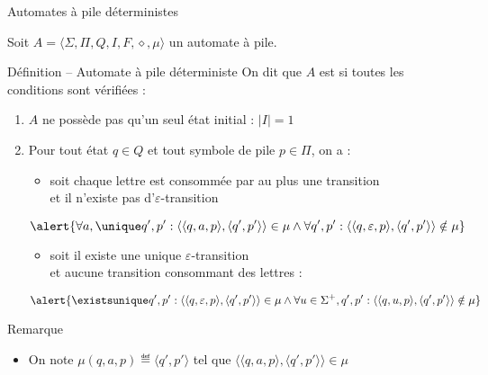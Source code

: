 
\begingroup

\begin{frame}{Automates à pile déterministes}

  Soit $A = \langle \Sigma, \Pi, Q, I, F, \diamond, \mu \rangle$ un automate à pile.

  \vspace{-1mm}
  \begin{block}{Définition -- Automate à pile déterministe}
    On dit que $A$ est  si toutes les conditions sont vérifiées : 
    \begin{enumerate}
    \item $A$ ne possède pas qu'un seul état initial : \alert{$|I| = 1$}
    \item Pour tout état $q \in Q$ et tout symbole de pile $p \in \Pi$, on a : 
      \begin{itemize}
      \item soit chaque lettre est consommée par au plus une transition \\
        et il n'existe pas d'$\varepsilon$-transition \\
      \end{itemize}
      $$\alert{\forall a, \unique q', p' : \langle \langle q, a, p\rangle, \langle q', p'\rangle \rangle \in \mu \land \forall q', p' : \langle \langle q, \varepsilon, p\rangle, \langle q', p'\rangle \rangle \notin \mu}$$
      \begin{itemize}
      \item \vspace{-5mm}soit il existe une unique $\varepsilon$-transition\\
        et aucune transition consommant des lettres :
      \end{itemize}
      $$\alert{\existsunique q', p' : \langle \langle q, \varepsilon, p\rangle, \langle q', p'\rangle \rangle \in \mu \land \forall u\in \Sigma^+, q', p' : \langle \langle q, u, p\rangle, \langle q', p'\rangle \rangle \notin \mu}$$
    \end{enumerate}
  \end{block}

  \vspace{-2mm}
  \begin{alertblock}{Remarque}
    \begin{itemize}
    \item \vspace{-1mm} On note $\mu(q, a, p) \eqdef \langle q', p'\rangle$ tel que $\langle \langle q, a, p\rangle, \langle q', p'\rangle \rangle \in \mu$
    \end{itemize}
  \end{alertblock}
\end{frame}

\endgroup
